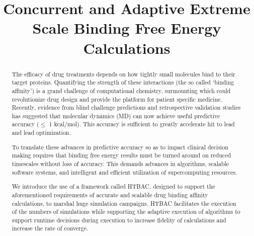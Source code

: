 \documentclass[conference]{IEEEtran}
\begin{document}
\title{Concurrent and Adaptive Extreme Scale Binding Free Energy Calculations}

 \author{
}


\maketitle




\begin{abstract}
The efficacy of drug treatments depends on how tightly small molecules bind
to their target proteins. Quantifying the strength of these interactions (the
so called ‘binding affinity’) is a grand challenge of computational
chemistry, surmounting which could revolutionize drug design and provide the
platform for patient specific medicine. Recently, evidence from blind
challenge predictions and retrospective validation studies has suggested that
molecular dynamics (MD) can now achieve useful predictive accuracy ($\leq$ 1
kcal/mol). This accuracy is sufficient to greatly accelerate hit to lead and
lead optimization.

To translate these advances in predictive accuracy so as to impact clinical
decision making requires that binding free energy results must be turned
around on reduced timescales without loss of accuracy. This demands advances
in algorithms, scalable software systems, and intelligent and efficient
utilization of supercomputing resources.

We introduce the use of a framework called HTBAC, designed to support the
aforementioned requirements of accurate and scalable drug binding affinity
calculations, to marshal huge simulation campaigns. HTBAC facilitates the
execution of the numbers of simulations while supporting the adaptive
execution of algorithms to support runtime decisions during execution to 
increase fidelity of calculations and increase the rate of converge.
\end{abstract}
\end{document}

